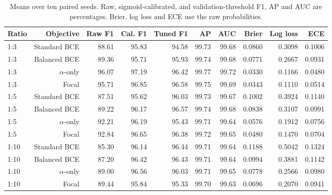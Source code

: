 \documentclass[10pt]{article}
\begin{document}
\begin{table}[ht]
\centering\color{black}\scriptsize
\caption{Means over ten paired seeds. Raw, sigmoid-calibrated, and validation-threshold F1, AP and AUC are percentages. Brier, log loss and ECE use the raw probabilities.}
\label{tab:probabilities}
\begin{tabular}{lrrrrrrrrr}
\toprule
Ratio & Objective & Raw F1 & Cal. F1 & Tuned F1 & AP & AUC & Brier & Log loss & ECE \\
\midrule
1:3 & Standard BCE & 88.61 & 95.83 & 94.58 & 99.73 & 99.68 & 0.0860 & 0.3098 & 0.1006 \\
1:3 & Balanced BCE & 89.36 & 95.71 & 95.93 & 99.74 & 99.68 & 0.0771 & 0.2667 & 0.0931 \\
1:3 & $\alpha$-only & 96.07 & 97.19 & 96.42 & 99.77 & 99.72 & 0.0330 & 0.1166 & 0.0480 \\
1:3 & Focal & 95.71 & 96.85 & 96.58 & 99.75 & 99.69 & 0.0343 & 0.1110 & 0.0514 \\
1:5 & Standard BCE & 87.51 & 95.62 & 96.03 & 99.73 & 99.67 & 0.1002 & 0.3924 & 0.1140 \\
1:5 & Balanced BCE & 89.22 & 96.17 & 96.57 & 99.74 & 99.68 & 0.0838 & 0.3107 & 0.0991 \\
1:5 & $\alpha$-only & 92.21 & 96.19 & 95.43 & 99.71 & 99.64 & 0.0576 & 0.1912 & 0.0756 \\
1:5 & Focal & 92.84 & 96.65 & 96.38 & 99.72 & 99.65 & 0.0480 & 0.1470 & 0.0704 \\
1:10 & Standard BCE & 85.30 & 96.14 & 96.44 & 99.71 & 99.64 & 0.1188 & 0.5042 & 0.1324 \\
1:10 & Balanced BCE & 87.20 & 96.42 & 96.43 & 99.71 & 99.64 & 0.0994 & 0.3881 & 0.1142 \\
1:10 & $\alpha$-only & 89.00 & 96.56 & 96.03 & 99.71 & 99.65 & 0.0778 & 0.2566 & 0.0980 \\
1:10 & Focal & 89.44 & 95.84 & 95.33 & 99.70 & 99.63 & 0.0696 & 0.2070 & 0.0941 \\
\bottomrule
\end{tabular}
\end{table}
\end{document}
